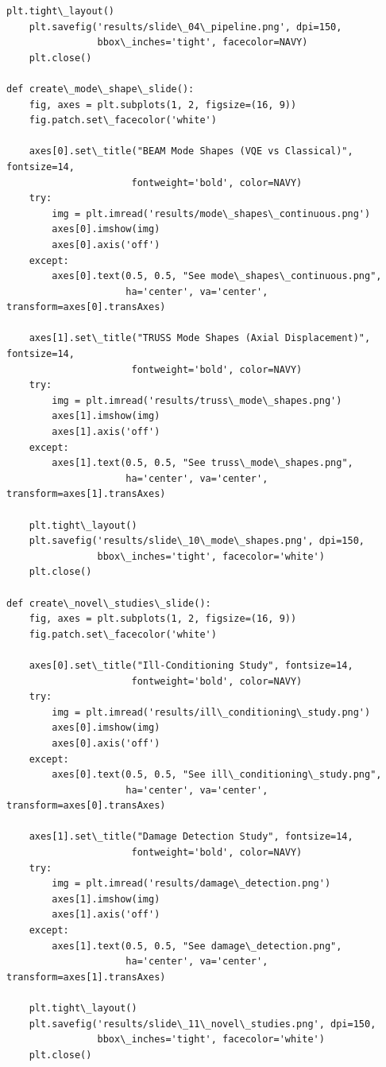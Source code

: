 \documentclass[12pt, a4paper]{article}
\begin{document}
\begin{lstlisting}[style=codestyle, caption={{generate_presentation.py --- Slide Generator}}]
    plt.tight\_layout()
    plt.savefig('results/slide\_04\_pipeline.png', dpi=150,
                bbox\_inches='tight', facecolor=NAVY)
    plt.close()

def create\_mode\_shape\_slide():
    fig, axes = plt.subplots(1, 2, figsize=(16, 9))
    fig.patch.set\_facecolor('white')

    axes[0].set\_title("BEAM Mode Shapes (VQE vs Classical)", fontsize=14,
                      fontweight='bold', color=NAVY)
    try:
        img = plt.imread('results/mode\_shapes\_continuous.png')
        axes[0].imshow(img)
        axes[0].axis('off')
    except:
        axes[0].text(0.5, 0.5, "See mode\_shapes\_continuous.png",
                     ha='center', va='center', transform=axes[0].transAxes)

    axes[1].set\_title("TRUSS Mode Shapes (Axial Displacement)", fontsize=14,
                      fontweight='bold', color=NAVY)
    try:
        img = plt.imread('results/truss\_mode\_shapes.png')
        axes[1].imshow(img)
        axes[1].axis('off')
    except:
        axes[1].text(0.5, 0.5, "See truss\_mode\_shapes.png",
                     ha='center', va='center', transform=axes[1].transAxes)

    plt.tight\_layout()
    plt.savefig('results/slide\_10\_mode\_shapes.png', dpi=150,
                bbox\_inches='tight', facecolor='white')
    plt.close()

def create\_novel\_studies\_slide():
    fig, axes = plt.subplots(1, 2, figsize=(16, 9))
    fig.patch.set\_facecolor('white')

    axes[0].set\_title("Ill-Conditioning Study", fontsize=14,
                      fontweight='bold', color=NAVY)
    try:
        img = plt.imread('results/ill\_conditioning\_study.png')
        axes[0].imshow(img)
        axes[0].axis('off')
    except:
        axes[0].text(0.5, 0.5, "See ill\_conditioning\_study.png",
                     ha='center', va='center', transform=axes[0].transAxes)

    axes[1].set\_title("Damage Detection Study", fontsize=14,
                      fontweight='bold', color=NAVY)
    try:
        img = plt.imread('results/damage\_detection.png')
        axes[1].imshow(img)
        axes[1].axis('off')
    except:
        axes[1].text(0.5, 0.5, "See damage\_detection.png",
                     ha='center', va='center', transform=axes[1].transAxes)

    plt.tight\_layout()
    plt.savefig('results/slide\_11\_novel\_studies.png', dpi=150,
                bbox\_inches='tight', facecolor='white')
    plt.close()


\end{lstlisting}
\end{document}
